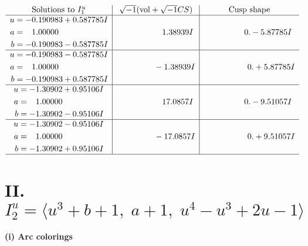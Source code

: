 \documentclass[1p]{elsarticle_modified}
\theoremstyle{definition}
\newcommand{\I}{\sqrt{-1}}
\begin{document}
$$\begin{array}{c|c|c}  
\text{Solutions to }I^u_{1}& \I (\text{vol} + \sqrt{-1}CS) & \text{Cusp shape}\\
 \hline 
\begin{aligned}
u &= -0.190983 + 0.587785 I \\
a &= \phantom{-}1.00000\phantom{ +0.000000I} \\
b &= -0.190983 - 0.587785 I\end{aligned}
 & \phantom{-0.000000 -}1.38939 I & \phantom{-0.000000 } 0. - 5.87785 I \\ \hline\begin{aligned}
u &= -0.190983 - 0.587785 I \\
a &= \phantom{-}1.00000\phantom{ +0.000000I} \\
b &= -0.190983 + 0.587785 I\end{aligned}
 & \phantom{-0.000000 } -1.38939 I & \phantom{-0.000000 -}0. + 5.87785 I \\ \hline\begin{aligned}
u &= -1.30902 + 0.95106 I \\
a &= \phantom{-}1.00000\phantom{ +0.000000I} \\
b &= -1.30902 - 0.95106 I\end{aligned}
 & \phantom{-0.000000 -}17.0857 I & \phantom{-0.000000 } 0. - 9.51057 I \\ \hline\begin{aligned}
u &= -1.30902 - 0.95106 I \\
a &= \phantom{-}1.00000\phantom{ +0.000000I} \\
b &= -1.30902 + 0.95106 I\end{aligned}
 & \phantom{-0.000000 } -17.0857 I & \phantom{-0.000000 -}0. + 9.51057 I\\
 \hline 
 \end{array}$$\newpage\newpage\renewcommand{\arraystretch}{1}
\centering \section*{II. $I^u_{2}= \langle u^3+b+1,\;a+1,\;u^4- u^3+2 u-1 \rangle$}
\flushleft \textbf{(i) Arc colorings}\\
\end{document}
